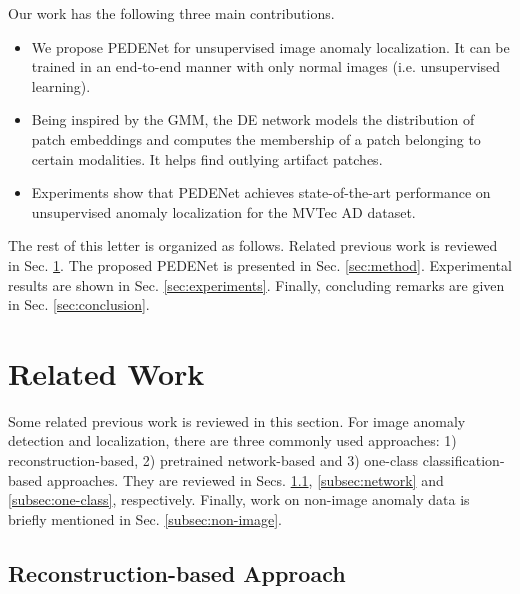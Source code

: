 \documentclass{article}
\begin{document}
Our work has the following three main contributions.
\begin{itemize}
\item We propose PEDENet for unsupervised image anomaly localization. It
can be trained in an end-to-end manner with only normal images (i.e.
unsupervised learning). 
\item Being inspired by the GMM, the DE network models the distribution
of patch embeddings and computes the membership of a patch belonging to
certain modalities. It helps find outlying artifact patches.
\item Experiments show that PEDENet achieves state-of-the-art performance on
unsupervised anomaly localization for the MVTec AD dataset. 
\end{itemize}

The rest of this letter is organized as follows. Related previous work
is reviewed in Sec. \ref{sec:review}. The proposed PEDENet is presented
in Sec. \ref{sec:method}. Experimental results are shown in Sec.
\ref{sec:experiments}. Finally, concluding remarks are given in Sec.
\ref{sec:conclusion}. 


\section{Related Work}\label{sec:review}
Some related previous work is reviewed in this section. For image
anomaly detection and localization, there are three commonly used
approaches: 1) reconstruction-based, 2) pretrained network-based and 3)
one-class classification-based approaches. They are reviewed in Secs.
\ref{subsec:reconstruction}, \ref{subsec:network} and
\ref{subsec:one-class}, respectively. Finally, work on non-image anomaly data
is briefly mentioned in Sec. \ref{subsec:non-image}.

\subsection{Reconstruction-based Approach}\label{subsec:reconstruction}
\end{document}
